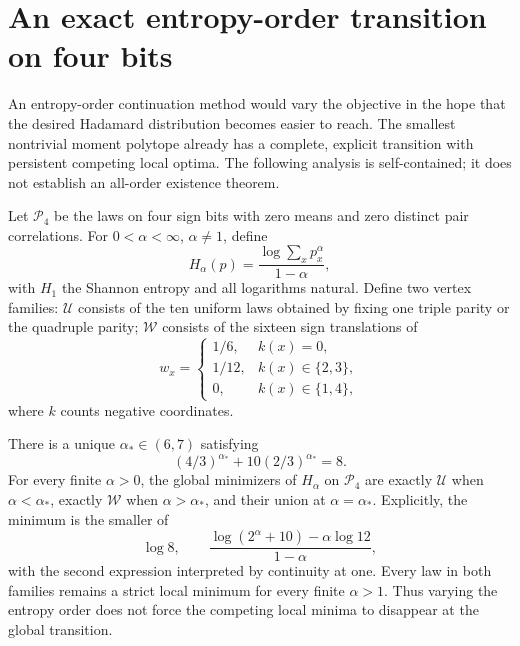 \section{An exact entropy-order transition on four bits}
\label{s33:sec:renyi-phase}
An entropy-order continuation method would vary the objective in the
hope that the desired Hadamard distribution becomes easier to reach.
The smallest nontrivial moment polytope already has a complete,
explicit transition with persistent competing local optima. The following analysis is self-contained; it does not establish an all-order existence theorem.

Let $\mathcal P_4$ be the laws on four sign bits with zero means and
zero distinct pair correlations. For $0<\alpha<\infty$, $\alpha\ne1$,
define
\[
 H_\alpha(p)=\frac{\log\sum_xp_x^\alpha}{1-\alpha},
\]
with $H_1$ the Shannon entropy and all logarithms natural.
Define two vertex families: $\mathcal U$ consists of the ten uniform
laws obtained by fixing one triple parity or the quadruple parity;
$\mathcal W$ consists of the sixteen sign translations of
\[
 w_x=\begin{cases}
 1/6,&k(x)=0,\\
 1/12,&k(x)\in\{2,3\},\\
 0,&k(x)\in\{1,4\},
 \end{cases}
\]
where $k$ counts negative coordinates.

\begin{theorem}\label{s33:thm:renyi-phase}
There is a unique $\alpha_*\in(6,7)$ satisfying
\[
 (4/3)^{\alpha_*}+10(2/3)^{\alpha_*}=8.
\]
For every finite $\alpha>0$, the global minimizers of $H_\alpha$ on
$\mathcal P_4$ are exactly $\mathcal U$ when $\alpha<\alpha_*$,
exactly $\mathcal W$ when $\alpha>\alpha_*$, and their union at
$\alpha=\alpha_*$. Explicitly, the minimum is the smaller of
\[
 \log8,\qquad
 \frac{\log(2^\alpha+10)-\alpha\log12}{1-\alpha},
\]
with the second expression interpreted by continuity at one.
Every law in both families remains a strict local minimum for every
finite $\alpha>1$. Thus varying the entropy order does not force
the competing local minima to disappear at the global transition.
\end{theorem}

